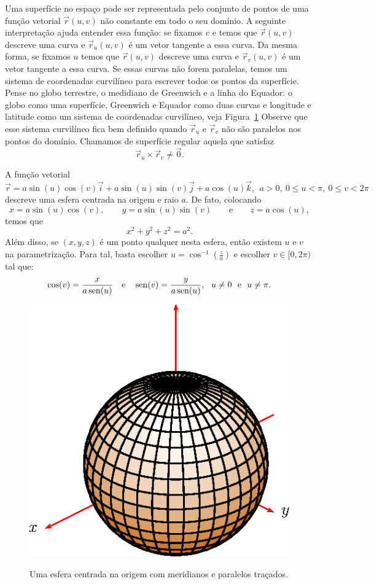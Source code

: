 Uma superfície no espaço pode ser representada pelo conjunto de pontos de uma função vetorial $\vec{r}(u,v)$ não constante em todo o seu domínio. A seguinte interpretação ajuda entender essa função: se fixamos $v$ e temos que $\vec{r}(u,v)$ descreve uma curva e $\vec{r}_u(u,v)$ é um vetor tangente a essa curva. Da mesma forma, se fixamos $u$ temos que $\vec{r}(u,v)$ descreve uma curva e $\vec{r}_v(u,v)$ é um vetor tangente a essa curva. Se essas curvas não forem paralelas, temos um sistema de coordenadas curvilíneo para escrever todos os pontos da superfície. Pense no globo terrestre, o medidiano de Greenwich e a linha do Equador: o globo como uma superfície, Greenwich e Equador como duas curvas e longitude e latitude como um sistema de coordenadas curvilíneo, veja Figura~\ref{cap_superficies_esfera} Observe que esse sistema curvilíneo fica bem definido quando $\vec{r}_u$ e $\vec{r}_v$ não são paralelos nos pontos do domínio. Chamamos de superfície regular aquela que satisfaz
$$
\vec{r}_u\times \vec{r}_v\neq \vec{0}.
$$
\begin{ex}A função vetorial
$$
\vec{r}=a\sin(u)\cos(v)\vec{i}+a\sin(u)\sin(v)\vec{j}+a\cos(u)\vec{k},~~ a>0, ~ 0\leq u< \pi, ~ 0\leq v< 2\pi
$$
descreve uma esfera centrada na origem e raio $a$. De fato, colocando $$x=a\sin(u)\cos(v),\qquad y=a\sin(u)\sin(v)\qquad\text{e}\qquad z=a\cos(u),$$
temos que
$$
x^2+y^2+z^2=a^2.
$$
Além disso, se $(x,y,z)$ é um ponto qualquer nesta esfera, então existem $u$ e $v$ na parametrização. Para tal, basta escolher $u=\cos^{-1}\left(\frac{z}{a}\right)$ e escolher $v\in[0,2\pi)$ tal que:
$$\cos(v)=\frac{x}{a\sin(u)} \quad \hbox{e} \quad \sin(v)=\frac{y}{a\sin(u)},~~u\neq 0 ~~ \hbox{e} ~~u\neq \pi.$$

 \begin{figure}%
\centering
 \includegraphics{cap_superficies/figs/figura_1}\label{cap_superficies_esfera}
\caption{Uma esfera centrada na origem com meridianos e paralelos traçados.}
\end{figure}
\end{ex}

